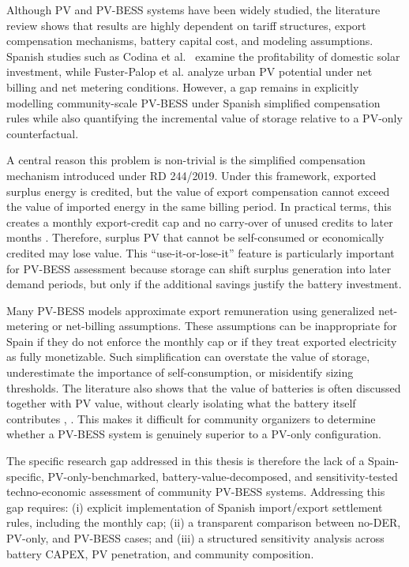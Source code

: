 Although PV and PV-BESS systems have been widely studied, the literature
review shows that results are highly dependent on tariff structures,
export compensation mechanisms, battery capital cost, and modeling
assumptions. Spanish studies such as Codina et al.~\cite{ch1ref008} examine the
profitability of domestic solar investment, while Fuster-Palop et al.
\cite{ch1ref009} analyze urban PV potential under net billing and net metering
conditions. However, a gap remains in explicitly modelling
community-scale PV-BESS under Spanish simplified compensation rules
while also quantifying the incremental value of storage relative to a
PV-only counterfactual.

A central reason this problem is non-trivial is the simplified
compensation mechanism introduced under RD 244/2019. Under this
framework, exported surplus energy is credited, but the value of export
compensation cannot exceed the value of imported energy in the same
billing period. In practical terms, this creates a monthly export-credit
cap and no carry-over of unused credits to later months \cite{ch1ref002}.
Therefore, surplus PV that cannot be self-consumed or economically
credited may lose value. This ``use-it-or-lose-it'' feature is
particularly important for PV-BESS assessment because storage can shift
surplus generation into later demand periods, but only if the additional
savings justify the battery investment.

Many PV-BESS models approximate export remuneration using generalized
net-metering or net-billing assumptions. These assumptions can be
inappropriate for Spain if they do not enforce the monthly cap or if
they treat exported electricity as fully monetizable. Such
simplification can overstate the value of storage, underestimate the
importance of self-consumption, or misidentify sizing thresholds. The
literature also shows that the value of batteries is often discussed
together with PV value, without clearly isolating what the battery
itself contributes \cite{ch1ref010}, \cite{ch1ref011}. This makes it difficult for
community organizers to determine whether a PV-BESS system is genuinely
superior to a PV-only configuration.

The specific research gap addressed in this thesis is therefore the lack
of a Spain-specific, PV-only-benchmarked, battery-value-decomposed, and
sensitivity-tested techno-economic assessment of community PV-BESS
systems. Addressing this gap requires: (i) explicit implementation of
Spanish import/export settlement rules, including the monthly cap; (ii)
a transparent comparison between no-DER, PV-only, and PV-BESS cases; and
(iii) a structured sensitivity analysis across battery CAPEX, PV
penetration, and community composition.

